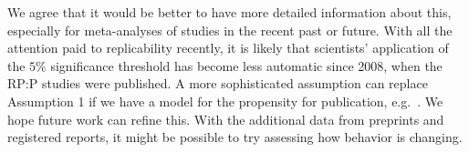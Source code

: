 \documentclass[]{article}
\theoremstyle{remark}
\begin{document}
\begin{itemize}
We agree that it would be better to have more detailed information about this, especially for meta-analyses of studies in the recent past or future. With all the attention paid to replicability recently, it is likely that scientists' application of the $5\%$ significance threshold has become less automatic since 2008, when the RP:P studies were published. A more sophisticated assumption can replace Assumption 1 if we have a model for the propensity for publication, e.g.\ \citet{Andrews:2018vh}. We hope future work can refine this. With the additional data from preprints and registered reports, it might be possible to try assessing how behavior is changing.




\end{itemize}
\end{document}
